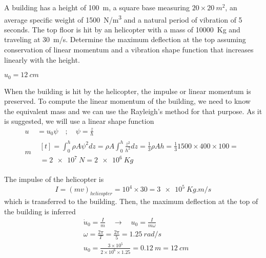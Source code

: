 
\begin{Exercise}[label={helicopter_impulse}]
A building has a height of \qty{100}{m}, a square base measuring $20\times\SI{20}{m^2}$, an average specific weight of \qty{1500}{N/m^3} and a natural period of vibration of 5 seconds. The top floor is hit by an helicopter with a mass of \qty{10000}{Kg} and traveling at \qty{30}{m/s}. Determine the maximum deflection at the top assuming conservation of linear momentum and a vibration shape function that increases linearly with the height.

\begin{center}
\end{center}

\shortAnswer $u_0 = \SI{12}{cm}$
\end{Exercise}



\begin{Answer}[ref={helicopter_impulse}]
When the building is hit by the helicopter, the impulse or linear momentum is preserved. To compute the linear momentum of the building, we need to know the equivalent mass and we can use the Rayleigh's method for that purpose. As it is suggested, we will use a linear shape function
\begin{align*}
u& = u_0\psi \quad ; \quad \psi = \frac{z}{h} \\
m& \begin{multlined}[t]= \int_0^h \rho A\psi^2dz = \rho A\int_0^h\frac{z^2}{h^2}dz = \frac{1}{3}\rho Ah = \frac{1}{3} 1500 \times 400 \times 100 = \\
    = \SI{2e7}{N} = \SI{2e6}{Kg} \end{multlined}
\end{align*}

The impulse of the helicopter is
$$
I = (mv)_{helicopter} = 10^4 \times 30 = \SI{3e5}{Kg.m/s}
$$
which is transferred to the building. Then, the maximum deflection at the top of the building is inferred
\begin{align*}
&\dot{u}_0 = \frac{I}{m} \quad \rightarrow \quad u_0 = \frac{I}{m\omega} \\
&\omega = \frac{2\pi}{T} = \frac{2\pi}{5} = \SI{1.25}{rad/s} \\
&u_0 = \frac{3\times 10^5}{2\times 10^6\times 1.25} = \SI{0.12}{m} = \SI{12}{cm}
\end{align*}
\end{Answer}
